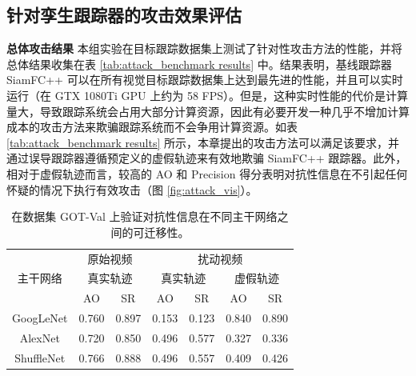 \subsection{针对孪生跟踪器的攻击效果评估}

\textbf{总体攻击结果} 本组实验在目标跟踪数据集上测试了针对性攻击方法的性能，并将总体结果收集在表 \ref{tab:attack_benchmark results} 中。结果表明，基线跟踪器 SiamFC++ 可以在所有视觉目标跟踪数据集上达到最先进的性能，并且可以实时运行（在 GTX 1080Ti GPU 上约为 58 FPS）。但是，这种实时性能的代价是计算量大，导致跟踪系统会占用大部分计算资源，因此有必要开发一种几乎不增加计算成本的攻击方法来欺骗跟踪系统而不会争用计算资源。如表 \ref{tab:attack_benchmark results} 所示，本章提出的攻击方法可以满足该要求，并通过误导跟踪器遵循预定义的虚假轨迹来有效地欺骗 SiamFC++ 跟踪器。此外，相对于虚假轨迹而言，较高的 AO 和 Precision 得分表明对抗性信息在不引起任何怀疑的情况下执行有效攻击（图 \ref{fig:attack_vis}）。

\begin{table}[t]
\centering
\caption{在数据集 GOT-Val 上验证对抗性信息在不同主干网络之间的可迁移性。}
\begin{tabular}{c cc cc cc} 
\toprule
\multirow{3}{*}[-6pt]{主干网络} & \multicolumn{2}{c}{原始视频}    & \multicolumn{4}{c}{扰动视频}                                        \\ 
\cmidrule(lr){2-3} \cmidrule(lr){4-7}
                          & \multicolumn{2}{c}{真实轨迹} & \multicolumn{2}{c}{真实轨迹} & \multicolumn{2}{c}{虚假轨迹}  \\ 
\cmidrule(lr){2-3} \cmidrule(lr){4-7}
                          & AO    & SR                           & AO    & SR                           & AO    & SR                           \\ 
\midrule
GoogLeNet \cite{GoogLeNet}   & 0.760 & 0.897 & 0.153 & 0.123 & 0.840 & 0.890 \\
AlexNet \cite{AlexNet}       & 0.720 & 0.850 & 0.496 & 0.577 & 0.327 & 0.336 \\
ShuffleNet \cite{ShuffleNet} & 0.766 & 0.888 & 0.496 & 0.557 & 0.409 & 0.426 \\
\bottomrule
\end{tabular}
\label{tab:backbone}
\end{table}

